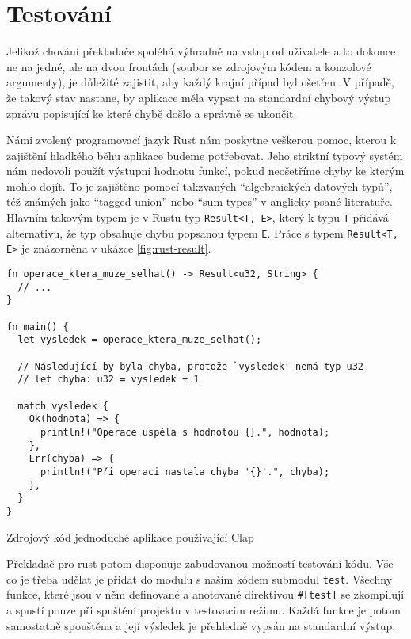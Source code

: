 \section{Testování}
\label{sec:asm-test}

Jelikož chování překladače spoléhá výhradně na vstup od uživatele a to dokonce ne na jedné, ale na dvou frontách (soubor se zdrojovým kódem a konzolové argumenty), je důležité zajistit, aby každý krajní případ byl ošetřen. V případě, že takový stav nastane, by aplikace měla vypsat na standardní chybový výstup zprávu popisující ke které chybě došlo a správně se ukončit.

Námi zvolený programovací jazyk Rust nám poskytne veškerou pomoc, kterou k zajištění hladkého běhu aplikace budeme potřebovat. Jeho striktní typový systém nám nedovolí použít výstupní hodnotu funkcí, pokud neošetříme chyby ke kterým mohlo dojít. To je zajištěno pomocí takzvaných ``algebraických datových typů'', též známých jako ``tagged union'' nebo ``sum types'' v anglicky psané literatuře. Hlavním takovým typem je v Rustu typ \texttt{Result<T, E>}, který k typu \texttt{T} přidává alternativu, že typ obsahuje chybu popsanou typem \texttt{E}. Práce s typem \texttt{Result<T, E>} je znázorněna v ukázce \ref{fig:rust-result}.

\begin{listing}
\begin{verbatim}
fn operace_ktera_muze_selhat() -> Result<u32, String> {
  // ...
} 

fn main() {
  let vysledek = operace_ktera_muze_selhat();
  
  // Následující by byla chyba, protože `vysledek' nemá typ u32
  // let chyba: u32 = vysledek + 1
  
  match vysledek {
    Ok(hodnota) => {
      println!("Operace uspěla s hodnotou {}.", hodnota);
    },
    Err(chyba) => {
      println!("Při operaci nastala chyba '{}'.", chyba);
    },
  }
}
\end{verbatim}
\caption{Zdrojový kód jednoduché aplikace používající Clap}
\label{fig:rust-result}
\end{listing}

Překladač pro rust potom disponuje zabudovanou možností testování kódu. Vše co je třeba udělat je přidat do modulu s naším kódem submodul \texttt{test}. Všechny funkce, které jsou v něm definované a anotované direktivou \texttt{#[test]} se zkompilují a spustí pouze při spuštění projektu v testovacím režimu. Každá funkce je potom samostatně spouštěna a její výsledek je přehledně vypsán na standardní výstup.

